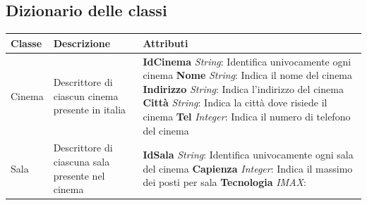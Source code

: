 \documentclass[12pt,a4paper]{book}
\begin{document}
	\subsection[short title]{Dizionario delle classi}
	\begin{center}

	\begin{tabular}{l p{3cm} p{10cm}}
		\hline
		Classe& Descrizione& Attributi\\
		\hline
		Cinema& Descrittore di ciascun cinema presente in italia& \textbf{IdCinema} \textit{String}: Identifica univocamente ogni cinema
		\newline \textbf{Nome} \textit{String}: Indica il nome del cinema
		\newline \textbf{Indirizzo} \textit{String}: Indica l'indirizzo del cinema
		\newline \textbf{Città} \textit{String}: Indica la città dove risiede il cinema
		\newline \textbf{Tel} \textit{Integer}: Indica il numero di telefono del cinema \\
		\hline
		Sala& Descrittore di ciascuna sala presente nel cinema &
		\textbf{IdSala} \textit{String}: Identifica univocamente ogni sala del cinema
		\newline \textbf{Capienza} \textit{Integer}: Indica il massimo dei posti per sala
		\newline \textbf{Tecnologia} \textit{IMAX}: \\
		\hline
	\end{tabular}
	\end{center}
		
\end{document}
